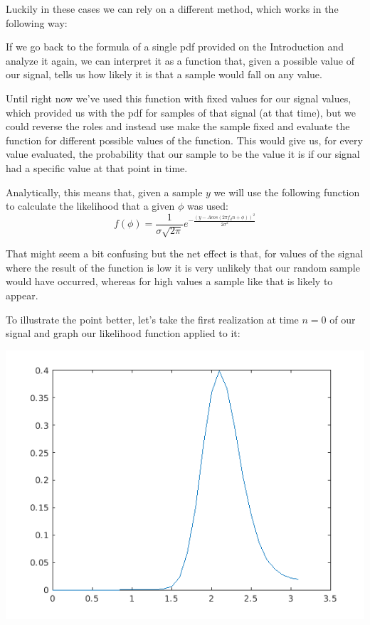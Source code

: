 \documentclass[conference,9pt]{IEEEtran}
\begin{document}
Luckily in these cases we can rely on a different method, which works in the following way:

If we go back to the formula of a single pdf provided on the Introduction and analyze it again, we can interpret it as a function that, given a possible value of our signal, tells us how likely it is that a sample would fall on any value.

Until right now we've used this function with fixed values for our signal values, which provided us with the pdf for samples of that signal (at that time), but we could reverse the roles and instead use make the sample fixed and evaluate the function for different possible values of the function. This would give us, for every value evaluated, the probability that our sample to be the value it is if our signal had a specific value at that point in time.

Analytically, this means that, given a sample $y$ we will use the following function to calculate the likelihood that a given $\phi$ was used:
$$f(\phi)=\frac{1}{\sigma\sqrt{2\pi}}e^{-\frac{(y-Acos(2 \pi f_d n + \phi ))^2}{2\sigma^2}}$$

That might seem a bit confusing but the net effect is that, for values of the signal where the result of the function is low it is very unlikely that our random sample would have occurred, whereas for high values a sample like that is likely to appear.

To illustrate the point better, let's take the first realization at time $n=0$ of our signal and graph our likelihood function applied to it:
  
  \includegraphics[scale=0.6]{nou6}
\end{document}
